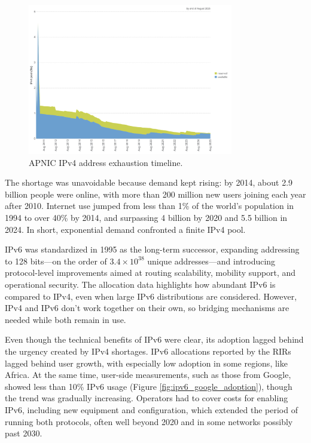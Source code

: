 \begin{figure}[H]
    \centering
    \caption{APNIC IPv4 address exhaustion timeline\cite{apnic_ipv4_exhaustion}.}
    \label{fig:ipv4_exhaustion_timeline}
    \includegraphics[width=0.8\textwidth]{resources/images/ipv4exhaustion}
\end{figure}

The shortage was unavoidable because demand kept rising: by 2014, about 2.9 billion people were online, with more than 200 million new users joining each year after 2010. Internet use jumped from less than 1\% of the world’s population in 1994 to over 40\% by 2014, and surpassing 4 billion by 2020 and 5.5 billion in 2024\cite{7737362, itu_d_statistics}. In short, exponential demand confronted a finite IPv4 pool.

IPv6 was standardized in 1995 as the long-term successor, expanding addressing to 128 bits—on the order of $3.4 \times 10^{38}$ unique addresses—and introducing protocol-level improvements aimed at routing scalability, mobility support, and operational security\cite{rfc1883,7737362,LEVIN20141059}. The allocation data highlights how abundant IPv6 is compared to IPv4, even when large IPv6 distributions are considered\cite{7737362}. However, IPv4 and IPv6 don't work together on their own, so bridging mechanisms are needed while both remain in use\cite{LEVIN20141059}.


Even though the technical benefits of IPv6 were clear, its adoption lagged behind the urgency created by IPv4 shortages. IPv6 allocations reported by the RIRs lagged behind user growth, with especially low adoption in some regions, like Africa. At the same time, user-side measurements, such as those from Google, showed less than 10\% IPv6 usage (Figure \ref{fig:ipv6_google_adoption}), though the trend was gradually increasing\cite{7737362}. Operators had to cover costs for enabling IPv6, including new equipment and configuration, which extended the period of running both protocols, often well beyond 2020 and in some networks possibly past 2030\cite{7737362}.

